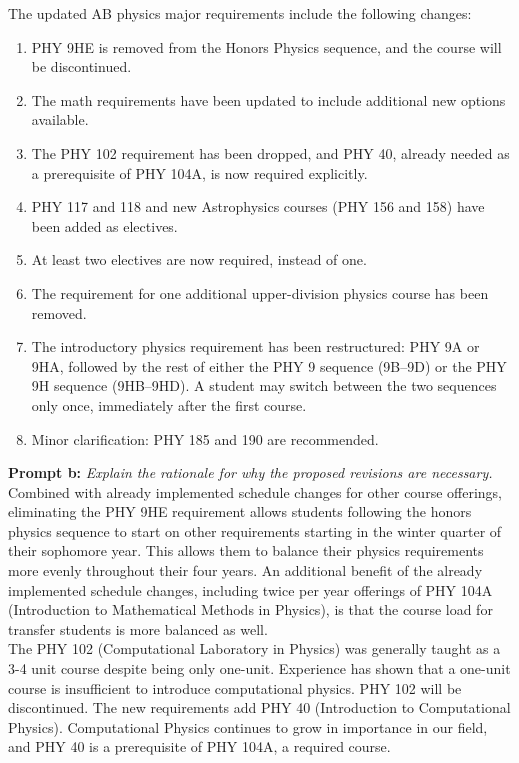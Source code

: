 \documentclass[12pt]{article}
\begin{document}
\noindent
The updated AB physics major requirements include the following changes:
\begin{enumerate}
\item PHY 9HE is removed from the Honors Physics sequence, and the
  course will be discontinued.
\item The math requirements have been updated to include additional
  new options available.
\item The PHY 102 requirement has been dropped, and PHY 40, already needed as a prerequisite of PHY 104A, is now required explicitly.
\item PHY 117 and 118 and new Astrophysics courses (PHY 156 and 158) have been added as electives.
\item At least two electives are now required, instead of one.
\item The requirement for one additional upper-division physics course has been removed.
\item The introductory physics requirement has been restructured:  PHY
  9A or 9HA, followed by the rest of either the PHY 9 sequence
  (9B--9D) or the PHY 9H sequence (9HB--9HD).  A student may switch
  between the two sequences only once, immediately after the first
  course.
\item Minor clarification:  PHY 185 and 190 are recommended.
\end{enumerate}

\noindent
{\bf Prompt b:} {\it Explain the rationale for why the proposed revisions are necessary.}\\[5pt]

\noindent
Combined with already implemented schedule changes for other course
offerings, eliminating the PHY 9HE requirement allows students following
the honors physics sequence to start on other requirements starting in
the winter quarter of their sophomore year.  This allows them to
balance their physics requirements more evenly throughout their four
years.  An additional benefit of the already implemented schedule changes,
including twice per year offerings of PHY 104A (Introduction to
Mathematical Methods in Physics), is that the course load for
transfer students is more balanced as well.\\[5pt]

\noindent
The PHY 102 (Computational Laboratory in Physics) was generally taught
as a 3-4 unit course despite being only one-unit.  Experience has
shown that a one-unit course is insufficient to introduce
computational physics.  PHY 102 will be discontinued.  The new
requirements add PHY 40 (Introduction to Computational Physics).
Computational Physics continues to grow in importance in our field,
and PHY 40 is a prerequisite of PHY 104A, a required course.\\[5pt]
\end{document}
